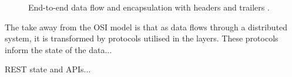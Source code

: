 \documentclass[../report.tex]{subfiles}
\begin{document}
\begin{figure}[h!]
\caption{End-to-end data flow and encapsulation with headers and trailers \cite[15]{alani2014guide}.}
\label{fig:dataflow}
\end{figure}

The take away from the OSI model is that as data flows through a distributed system, it is transformed by protocols utilised in the layers. These protocols inform the state of the data...

REST state and APIs... \cite{tarkoma2012publish}





\end{document}

